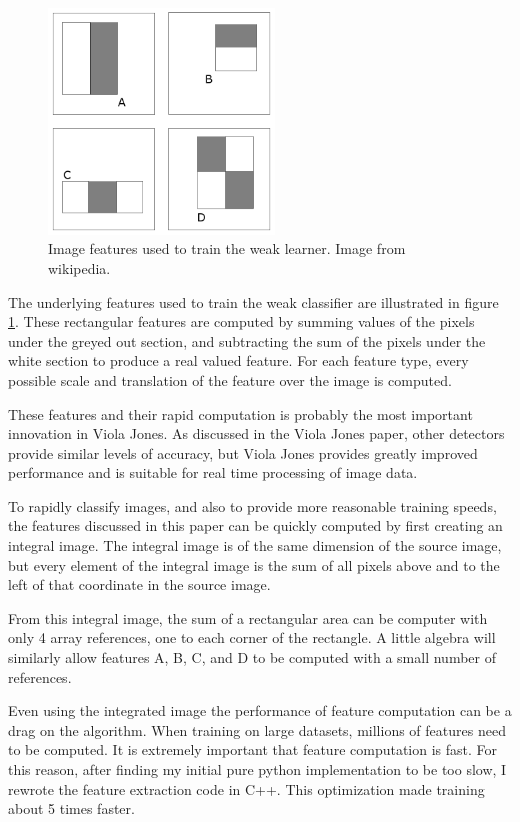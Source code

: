 \documentclass[11pt,twocolumn]{article}
\begin{document}
\begin{figure}
\includegraphics[width=60mm]{features.png}
\caption{Image features used to train the weak learner. Image from wikipedia.}
\label{fig:features}
\end{figure}

The underlying features used to train the weak classifier are
illustrated in figure \ref{fig:features}. These rectangular features
are computed by summing values of the pixels under the greyed out
section, and subtracting the sum of the pixels under the white section
to produce a real valued feature. For each feature type, every
possible scale and translation of the feature over the image is
computed.

These features and their rapid computation is probably the most
important innovation in Viola Jones. As discussed in the Viola Jones
paper\cite{violajones2001}, other detectors provide similar levels
of accuracy, but Viola Jones provides greatly improved performance and
is suitable for real time processing of image data.

To rapidly classify images, and also to provide more reasonable
training speeds, the features discussed in this paper can be quickly
computed by first creating an integral image. The integral image is of
the same dimension of the source image, but every element of the
integral image is the sum of all pixels above and to the left of that
coordinate in the source image.

From this integral image, the sum of a rectangular area can be
computer with only 4 array references, one to each corner of the
rectangle. A little algebra will similarly allow features A, B, C, and
D to be computed with a small number of references.

Even using the integrated image the performance of feature computation
can be a drag on the algorithm. When training on large datasets,
millions of features need to be computed. It is extremely important
that feature computation is fast. For this reason, after finding my
initial pure python implementation to be too slow, I rewrote the
feature extraction code in C++. This optimization made training about
5 times faster.
\end{document}
